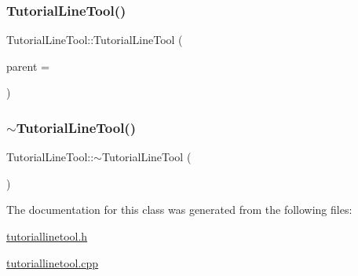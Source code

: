 \subsubsection{\texorpdfstring{Tutorial\+Line\+Tool()}{TutorialLineTool()}}
{\footnotesize\ttfamily Tutorial\+Line\+Tool\+::\+Tutorial\+Line\+Tool (\begin{DoxyParamCaption}\item[{Q\+Widget $\ast$}]{parent = {} }\end{DoxyParamCaption})\hspace{0.3cm}{\ttfamily [explicit]}}

\mbox{\label{class_tutorial_line_tool_a03f51cf61b5bbf1798e86452195aeef2}} 
\subsubsection{\texorpdfstring{$\sim$\+Tutorial\+Line\+Tool()}{~TutorialLineTool()}}
{\footnotesize\ttfamily Tutorial\+Line\+Tool\+::$\sim$\+Tutorial\+Line\+Tool (\begin{DoxyParamCaption}{ }\end{DoxyParamCaption})}



The documentation for this class was generated from the following files\+:\begin{DoxyCompactItemize}
\item 
\hyperlink{tutoriallinetool_8h}{tutoriallinetool.\+h}\item 
\hyperlink{tutoriallinetool_8cpp}{tutoriallinetool.\+cpp}\end{DoxyCompactItemize}
